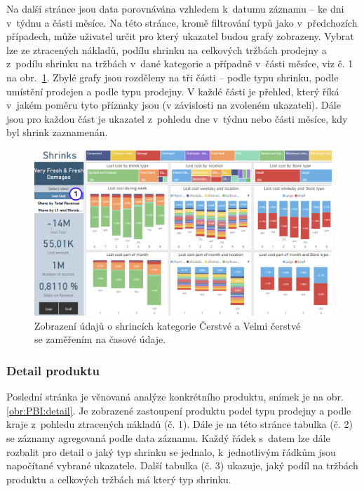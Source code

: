 Na další stránce jsou data porovnávána vzhledem k~datumu záznamu -- ke dni v~týdnu a části měsíce. Na této stránce, kromě filtrování typů jako v~předchozích případech, může uživatel určit pro který ukazatel budou grafy zobrazeny. Vybrat lze ze ztracených nákladů, podílu shrinku na celkových tržbách prodejny a z~podílu shrinku na tržbách v~dané kategorie a případně v~části měsíce, viz č. 1 na obr.~\ref*{obr:PBI:timeSFF}. Zbylé grafy jsou rozděleny na tři části -- podle typu shrinku, podle umístění prodejen a podle typu prodejny. V každé části je přehled, který říká v~jakém poměru tyto příznaky jsou (v závislosti na zvoleném ukazateli). Dále jsou pro každou část je ukazatel z~pohledu dne v~týdnu nebo části měsíce, kdy byl shrink zaznamenán. 

\begin{figure}[h!]
    \centering
    \captionsetup{justification=centering}
    \includegraphics[width=\textwidth]{obrazky/PBI/timeSFF.png}
    \caption{Zobrazení údajů o shrincích kategorie Čerstvé a Velmi čerstvé \\ se zaměřením na časové údaje.}
    \label{obr:PBI:timeSFF}
\end{figure}

\subsubsection*{Detail produktu}

Poslední stránka je věnovaná analýze konkrétního produktu, snímek je na obr. \ref*{obr:PBI:detail}. Je zobrazené zastoupení produktu podel typu prodejny a podle kraje z~pohledu ztracených nákladů (č. 1). Dále je na této stránce tabulka (č. 2) se záznamy agregovaná podle data záznamu. Každý řádek s~datem lze dále rozbalit pro detail o jaký typ shrinku se jednalo, k~jednotlivým řádkům jsou napočítané vybrané ukazatele. Další tabulka (č. 3) ukazuje, jaký podíl na tržbách produktu a celkových tržbách má který typ shrinku. 

